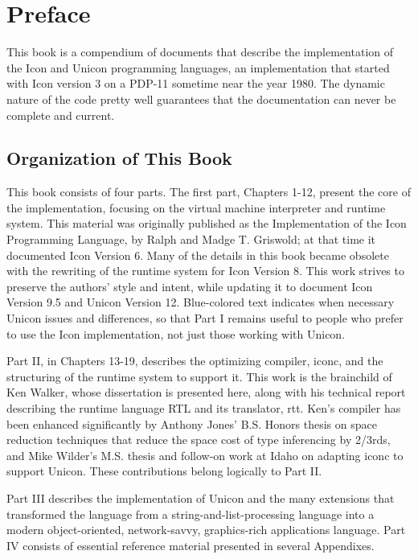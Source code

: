\chapter{Preface}

This book is a compendium of documents that describe the
implementation of the Icon and Unicon programming languages, an
implementation that started with Icon version 3 on a PDP-11 sometime
near the year 1980. The dynamic nature of the code pretty well
guarantees that the documentation can never be complete and current.

\section*{Organization of This Book}

This book consists of four parts. The first part, Chapters 1-12,
present the core of the implementation, focusing on the virtual
machine interpreter and runtime system. This material was originally
published as the Implementation of the Icon Programming Language, by
Ralph and Madge T. Griswold; at that time it documented Icon Version
6. Many of the details in this book became obsolete with the rewriting
of the runtime system for Icon Version 8. This work strives to
preserve the authors' style and intent, while updating
it to document Icon Version 9.5 and Unicon Version 12. Blue-colored
text indicates when necessary Unicon issues and differences, so that
Part I remains useful to people who prefer to use the Icon
implementation, not just those working with Unicon.

Part II, in Chapters 13-19, describes the optimizing compiler, iconc,
and the structuring of the runtime system to support it. This work is
the brainchild of Ken Walker, whose dissertation is presented here,
along with his technical report describing the runtime language RTL
and its translator, rtt. Ken's compiler has been enhanced
significantly by Anthony Jones' B.S. Honors thesis on space
reduction techniques that reduce the space cost of type inferencing by
2/3rds, and Mike Wilder's M.S. thesis and follow-on work at
Idaho on adapting iconc to support Unicon. These contributions belong
logically to Part II.

Part III describes the implementation of Unicon and the many
extensions that transformed the language from a
string-and-list-processing language into a modern object-oriented,
network-savvy, graphics-rich applications language.  Part IV consists
of essential reference material presented in several Appendixes.

